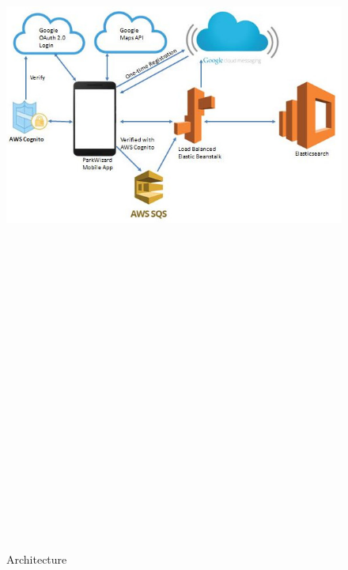 \documentclass[final]{beamer}
\newlength{\twocolwid}
\begin{document}
\begin{frame}[t]
\begin{columns}[t]
\begin{column}{\twocolwid}
\vspace{1ex}

\begin{figure}
\includegraphics[width=50cm,height=29cm]{architecture_2.JPG}
\caption{Architecture}
\end{figure}


\end{column}
\end{columns}
\end{frame}
\end{document}
